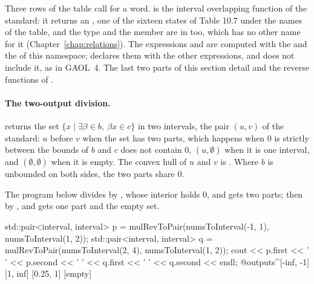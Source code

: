 \documentclass[12pt,a4paper,twoside,openright]{book}
\begin{document}
\noindent
Three rows of the table call for a word.  is the interval
overlapping function of the standard: it returns an
, one of the sixteen states of Table 10.7 under the
names of the table, and the type and the member  are in
 too, which has no other name for it
(Chapter~\ref{chap:relations}).\newinvfive{} The expressions 
and  are computed with the  and the 
of this namespace;  declares them with
the other expressions, and  does not include it, as in
GAOL~4. The last two parts of this section detail  and
the reverse functions of .

\paragraph{The two-output division.}
%
 returns the set
$\{x \mid \exists\beta\in b,\ \beta x\in c\}$ in two intervals, the pair
$(u,v)$ of the standard: $u$ before $v$ when the set has two parts, which
happens when 0 is strictly between the bounds of $b$ and $c$ does not contain
0, $(u,\emptyset)$ when it is one interval, and $(\emptyset,\emptyset)$ when
it is empty. The convex hull of $u$ and $v$ is . Where
$b$ is unbounded on both sides, the two parts share 0.\newinvfive

\begin{Ex}\label{ex:ieee1788-mulrevtopair}
The program below divides  by , whose interior holds 0,
and gets two parts; then by , and gets one part and the empty set.
\begin{example}
std::pair<interval, interval> p = mulRevToPair(numsToInterval(-1, 1),
                                               numsToInterval(1, 2));
std::pair<interval, interval> q = mulRevToPair(numsToInterval(2, 4),
                                               numsToInterval(1, 2));
cout << p.first << ' ' << p.second << ' '
     << q.first << ' ' << q.second << endl;
@outputs^[-inf, -1] [1, inf] [0.25, 1] [empty]~
\end{example}
\end{Ex}
\end{document}
